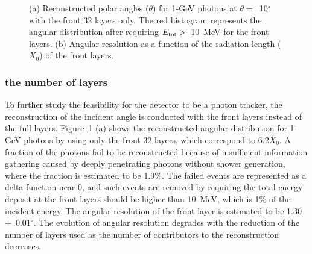 \documentclass[12pt,times,draftclsnofoot,a4paper]{elsarticle}
\begin{document}
\begin{figure}[!hbt]
\centering
{}
\caption{ (a) Reconstructed polar angles ($\theta$) for 1-GeV photons at $\theta=$~10$^{\circ}$  with the front 32 layers only. The red histogram represents the angular distribution after requiring $E_{\rm{tot}}>$~10~MeV for the front layers. (b) Angular resolution as a function of the radiation length ($X_{0}$) of the front layers.}
\label{fig:angle_reco_layer}
\end{figure}

\subsubsection{the number of layers}
To further study the feasibility for the detector to be a photon tracker, the reconstruction of the incident angle is conducted with the front layers instead of the full layers. %
Figure~\ref{fig:angle_reco_layer} (a) shows the reconstructed angular distribution for 1-GeV photons by using only the front 32 layers, which correspond to 6.2$X_{0}$. A fraction of the photons fail to be reconstructed because of insufficient information gathering caused by deeply penetrating photons without shower generation, where the fraction is estimated to be 1.9\%. The failed events are represented as a delta function near 0, and such events are removed by requiring the total energy deposit at the front layers should be higher than 10~MeV, which is 1\% of the incident energy. The angular resolution of the front layer is estimated to be 1.30~$\pm$~0.01$^{\circ}$. The evolution of angular resolution degrades with the reduction of the number of layers used as the number of contributors to the reconstruction decreases.
\end{document}
